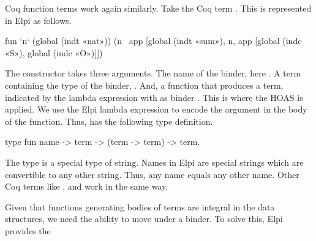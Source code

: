\documentclass[thesis.tex]{subfiles}
\begin{document}
{{Coq function terms work again similarly. Take the Coq term . This is represented in Elpi as follows.
\begin{elpicode}
  fun `n` (global (indt «nat»)) 
            (n \ app [global (indt «sum»), 
                      n, app [global (indc «S»), 
                              global (indc «O»)]])
\end{elpicode}
The  constructor takes three arguments. The name of the binder, here . A term containing the type of the binder, . And, a function that produces a term, indicated by the lambda expression with as binder . This is where the HOAS is applied. We use the Elpi lambda expression to encode the argument in the body of the function. Thus,  has the following type definition.
\begin{elpicode}
  type fun name -> term -> (term -> term) -> term.
\end{elpicode}
The type  is a special type of string. Names in Elpi are special strings which are convertible to any other string. Thus, any name equals any other name. Other Coq terms like ,  and  work in the same way.

Given that functions generating bodies of terms are integral in the \ce data structures, we need the ability to move under a binder. To solve this, Elpi provides the }}
\end{document}
